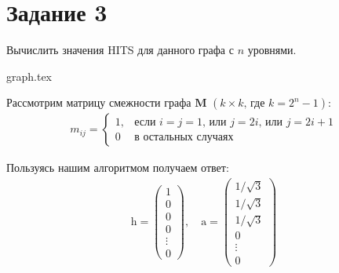 \documentclass[class=article,crop=false]{standalone}
\begin{document}
    \section*{Задание 3}
    Вычислить значения HITS для данного графа с $n$ уровнями.

    \begin{figure*}[h]
        \centering
        {graph.tex}
    \end{figure*}

    \noindent Рассмотрим матрицу смежности графа $\mathbf{M}$ $\left( k\times k\text{, где }k=2^n-1 \right)$:
    \begin{gather*}
        m_{ij}=
        \begin{cases}
            1,&\text{если $i=j=1$, или $j=2i$, или $j=2i+1$}\\
            0&\text{в остальных случаях}
        \end{cases}
    \end{gather*}

    \noindent Пользуясь нашим алгоритмом получаем ответ:
    \begin{gather*}
        \mathrm{h}=
        \begin{pmatrix}
            1      \\
            0      \\
            0      \\
            0      \\
            \vdots \\
            0
        \end{pmatrix},\quad
        \mathrm{a}=
        \begin{pmatrix}
            1/\sqrt{3} \\
            1/\sqrt{3} \\
            1/\sqrt{3} \\
            0          \\
            \vdots     \\
            0
        \end{pmatrix}
    \end{gather*}
\end{document}
